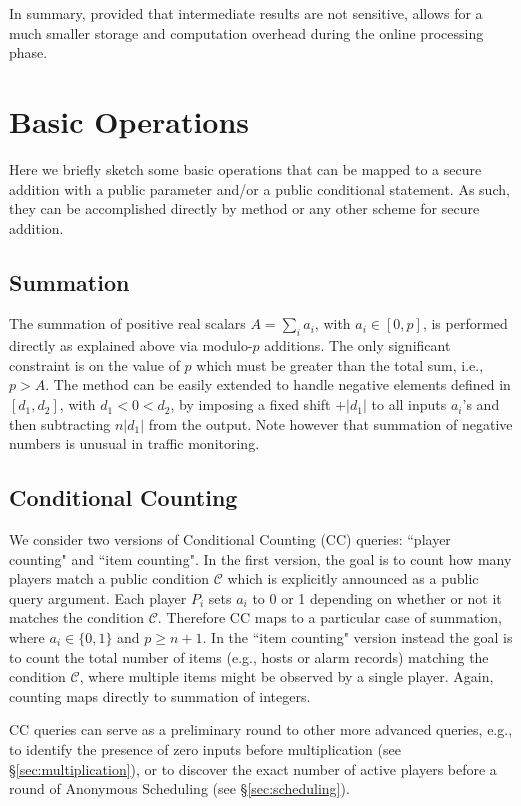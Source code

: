 \documentclass{sig-alternate}
\begin{document}
In summary, provided that intermediate results are not sensitive, \ata allows for a much smaller storage and computation overhead during the online processing phase.


\section{Basic Operations}\label{sec:operations}
Here we briefly sketch some basic operations that can be mapped to a secure addition
with a public parameter and/or a public conditional statement.
As such, they can be accomplished directly by   \ata method  or any other scheme for secure addition.


\subsection{Summation}\label{sec:summation}
The summation of positive real scalars $A=\sum_i{a_i}$, with $a_i \in [0,p]$, is performed directly as explained above via modulo-$p$ additions. The only significant  constraint is on the value of $p$ which must be greater than the total sum, i.e., $p > A$. 
The method can be easily extended to handle negative elements defined in $[d_1,d_2]$, with $d_1 < 0 < d_2$, by imposing a fixed shift $+|d_1|$ to all inputs $a_i$'s and then subtracting $n|d_1|$ from the output.  Note however that summation of negative numbers is unusual in  traffic monitoring.

\subsection{Conditional Counting}\label{sec:counting}
We consider two versions of Conditional Counting (CC) queries: ``player counting"  and ``item counting".
In the first version, the goal is to count how many players match a public condition $\mathcal{C}$ which is
explicitly announced as a public query argument.
Each player $P_i$ sets $a_i$ to 0 or 1 depending on whether or not it matches the condition $\mathcal{C}$.
Therefore CC maps to a particular case of summation, where $a_i \in \{0,1\}$ and $p  \geq n+1$.  In the ``item counting" version instead the goal is to count the total number of items (e.g., hosts or alarm records) matching the condition $\mathcal{C}$, where multiple items might be observed by a single player. Again, counting maps directly to summation of integers.

CC queries can serve as a preliminary round to other more advanced queries, e.g., to identify the presence of zero inputs before multiplication (see \S \ref{sec:multiplication}), or to discover the exact number of active players  before a round of Anonymous Scheduling (see \S \ref{sec:scheduling}). 
\end{document}
